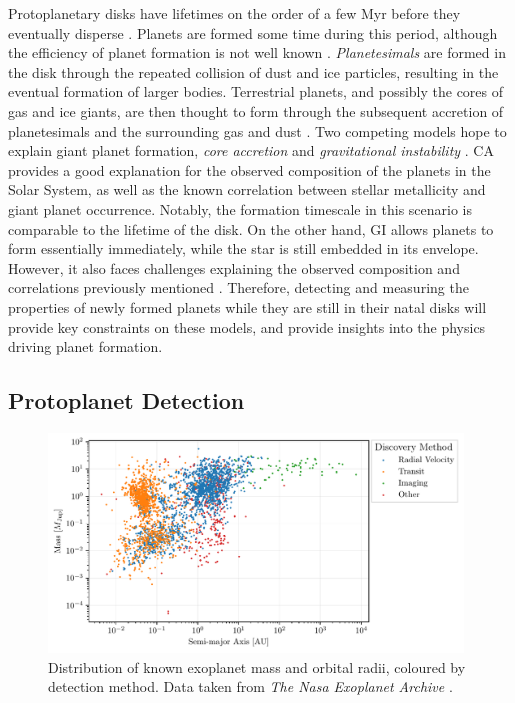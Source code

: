 Protoplanetary disks have lifetimes on the order of a few Myr before they eventually disperse \citep[see review by][]{ercolano2017}.
Planets are formed some time during this period, although the efficiency of planet formation is not well known \citep[see review by][]{helled2014}.
\textit{Planetesimals} are formed in the disk through the repeated collision of dust and ice particles, resulting in the eventual formation of larger bodies.
Terrestrial planets, and possibly the cores of gas and ice giants, are then thought to form through the subsequent accretion of planetesimals and the surrounding gas and dust \citep[e.g.][]{johansen2014}.
Two competing models hope to explain giant planet formation, \textit{core accretion} \citep[CA;][]{lissauer1993,pollack1996,safronov1972} and \textit{gravitational instability} \citep[GI;][]{kuiper1951,cameron1978}.
CA provides a good explanation for the observed composition of the planets in the Solar System, as well as the known correlation between stellar metallicity and giant planet occurrence.
Notably, the formation timescale in this scenario is comparable to the lifetime of the disk.
On the other hand, GI allows planets to form essentially immediately, while the star is still embedded in its envelope.
However, it also faces challenges explaining the observed composition and correlations previously mentioned \citep[see review by][]{helled2014}.
Therefore, detecting and measuring the properties of newly formed planets while they are still in their natal disks will provide key constraints on these models, and provide insights into the physics driving planet formation.

\subsection{Protoplanet Detection}

\begin{figure}
    \centering
    \includegraphics[width = 0.98\textwidth]{figures/exoplanet.pdf}
    \caption{Distribution of known exoplanet mass and orbital radii, coloured by detection method. Data taken from \textit{The Nasa Exoplanet Archive} \citep{nasa2022}.}
    \label{fig:exoplanets}
\end{figure}

